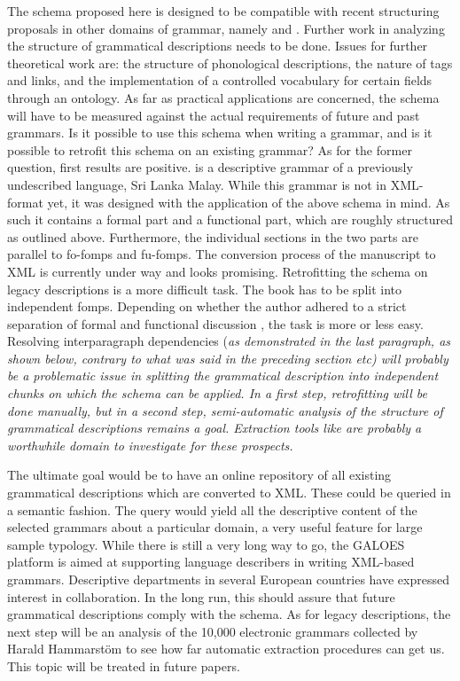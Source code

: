 The schema proposed here is designed to be compatible with recent structuring proposals in other domains of grammar, namely \citet{BowEtAl2003} and \citet{Good2004}. Further work in analyzing the structure of grammatical descriptions needs to be done. Issues for further theoretical work are: the structure of phonological descriptions, the nature of tags and links, and the implementation of a controlled vocabulary for certain fields through an ontology. As far as practical applications are concerned, the schema will have to be measured against the actual requirements of future and past grammars. Is it possible to use this schema when writing a grammar, and is it possible to retrofit this schema on an existing grammar? As for the former question, first results are positive. \citet{Nordhoff2009phd} is a descriptive grammar of a previously undescribed language, Sri Lanka Malay. While this grammar is not in XML-format yet, it was designed with the application of the above schema in mind. As such it contains a formal part and a functional part, which are roughly structured as outlined above. Furthermore, the individual sections in the two parts are parallel to fo-fomps and fu-fomps. The conversion process of the manuscript to XML is currently under way and looks promising. Retrofitting the schema on legacy descriptions is a more difficult task. The book has to be split into independent fomps. Depending on whether the author adhered to a strict separation of formal and functional discussion \citep[e.g.][]{Seiler1985}, the task is more or less easy. Resolving interparagraph dependencies (\em as demonstrated in the last paragraph, as shown below, contrary to what was said in the preceding section \em etc) will probably be a problematic issue in splitting the grammatical description into independent chunks on which the schema can be applied. In a first step, retrofitting will be done manually, but in a second step, semi-automatic analysis of the structure of grammatical descriptions remains a goal. Extraction tools like \citet{Lewis2006} are probably a worthwhile domain to investigate for these prospects.

The ultimate goal would be to have an online repository of all existing grammatical descriptions which are converted to XML. These could be queried in a semantic fashion. The query would yield all the descriptive content of the selected grammars about a particular domain, a very useful feature for large sample typology. While there is still a very long way to go, the GALOES platform \citep{Nordhoff2007alt,Nordhoff2007dobes,Nordhoff2007mpi} is aimed at supporting language describers in writing XML-based grammars. Descriptive departments in several European countries have expressed interest in collaboration. In the long run, this should assure that future grammatical descriptions comply with the schema. As for legacy descriptions, the next step will be an analysis of the 10,000 electronic grammars collected by Harald Hammarstöm to see how far automatic extraction procedures can get us. This topic will be treated in future papers.  

